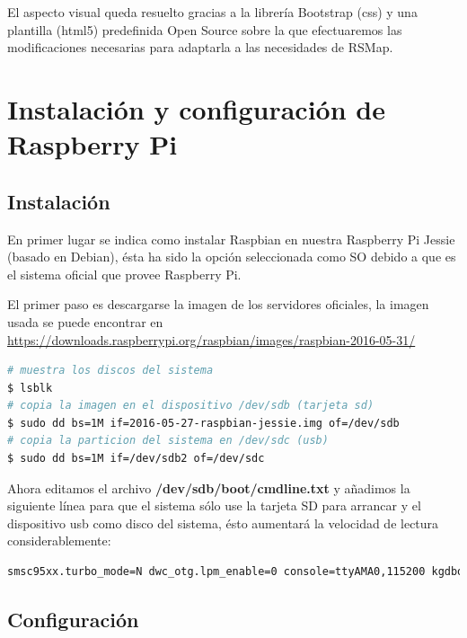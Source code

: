 El aspecto visual queda resuelto gracias a la librería Bootstrap (css) y una plantilla (html5) predefinida Open Source sobre la que efectuaremos las modificaciones necesarias para adaptarla a las necesidades de RSMap.

\section{Instalación y configuración de Raspberry Pi}

\subsection{Instalación}

En primer lugar se indica como instalar Raspbian en nuestra Raspberry Pi Jessie (basado en Debian), ésta ha sido la opción seleccionada como SO debido a que es el sistema oficial que provee Raspberry Pi.

\bigskip

El primer paso es descargarse la imagen de los servidores oficiales, la imagen usada se puede encontrar en \url{https://downloads.raspberrypi.org/raspbian/images/raspbian-2016-05-31/}

\begin{lstlisting}[language=bash,caption={Copia de Raspbian en tarjeta s y usb},label={lst:pi1}]
# muestra los discos del sistema
$ lsblk
# copia la imagen en el dispositivo /dev/sdb (tarjeta sd)
$ sudo dd bs=1M if=2016-05-27-raspbian-jessie.img of=/dev/sdb
# copia la particion del sistema en /dev/sdc (usb)
$ sudo dd bs=1M if=/dev/sdb2 of=/dev/sdc
\end{lstlisting}

\bigskip

Ahora editamos el archivo \textbf{/dev/sdb/boot/cmdline.txt} y añadimos la siguiente línea para que el sistema sólo use la tarjeta SD para arrancar y el dispositivo usb como disco del sistema, ésto aumentará la velocidad de lectura considerablemente:


\begin{lstlisting}[language=bash,caption={Modificando el dispositivo de arranque de Raspbian},label={lst:pi2}]
smsc95xx.turbo_mode=N dwc_otg.lpm_enable=0 console=ttyAMA0,115200 kgdboc=ttyAMA0,115200 console=tty1 root=/dev/sda1 rootfstype=ext4 elevator=noop rootwait # /dev/sda1 point to our USB drive
\end{lstlisting}

\bigskip

\subsection{Configuración}

